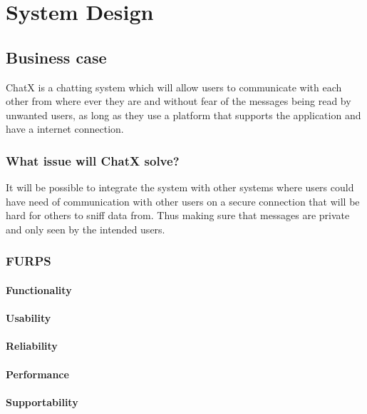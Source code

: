 \chapter{System Design}

\section{Business case}

ChatX is a chatting system which will allow users to communicate with each other from where ever they are and without fear of the messages being read by unwanted users, as long as they use a platform that supports the application and have a internet connection.

\subsection{What issue will ChatX solve?}
It will be possible to integrate the system with other systems where users could have need of communication with other users on a secure connection that will be hard for others to sniff data from. Thus making sure that messages are private and only seen by the intended users.

\subsection{FURPS}

\subsubsection{Functionality}

\subsubsection{Usability}

\subsubsection{Reliability}

\subsubsection{Performance}

\subsubsection{Supportability}

